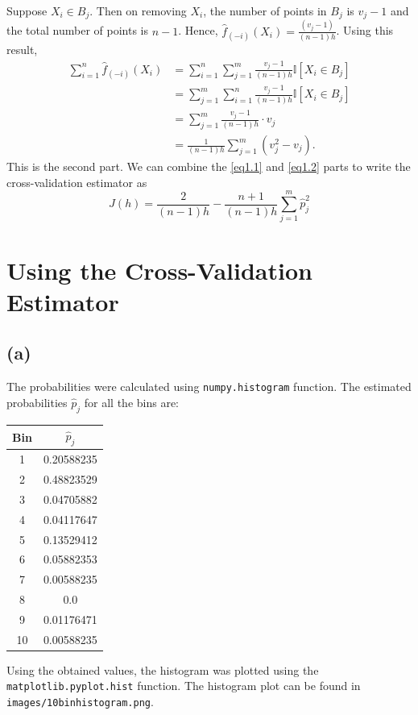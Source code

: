 Suppose $X_i\in B_j$. Then on removing $X_i$, the number of points in $B_j$ is
$v_j-1$ and the total number of points is $n-1$. Hence, $\hat{f}_{(-i)}(X_i) =
\frac{(v_j-1)}{(n-1)h}$. Using this result, 
\begin{equation}
  \begin{aligned}
    \sum_{i=1}^{n} \hat{f}_{(-i)}(X_i) &= \sum_{i=1}^{n}\sum_{j=1}^{m} \frac{v_j-
    1}{(n-1)h}\mathbb{I}[X_i\in B_j] \\
    &= \sum_{j=1}^{m}\sum_{i=1}^{n} \frac{v_j-1}{(n-1)h}\mathbb{I}[X_i\in B_j] \\
    &= \sum_{j=1}^{m} \frac{v_j-1}{(n-1)h}\cdot v_j \\
    &= \frac{1}{(n-1)h}\sum_{j=1}^{m} (v_j^2 - v_j).
  \end{aligned}
  \label{eq1.2}
\end{equation}
This is the second part. We can combine the \ref{eq1.1} and \ref{eq1.2} parts to
write the cross-validation estimator as 
\begin{equation*}
  \hat{J}(h) = \frac{2}{(n-1)h} - \frac{n+1}{(n-1)h}\sum_{j=1}^{m} \hat{p}_j^2
\end{equation*}

\section{ Using the Cross-Validation Estimator}

\subsection*{(a)}
The probabilities were calculated using \texttt{numpy.histogram} function. The
estimated probabilities $\hat{p}_j$ for all the bins are:
\begin{center}
  \begin{tabular}{ | c | c |}
    \hline
    \textbf{Bin} & \textbf{$\hat{p}_j$} \\
    \hline
    1 & 0.20588235 \\
    2 & 0.48823529 \\
    3 & 0.04705882 \\
    4 & 0.04117647 \\
    5 & 0.13529412 \\
    6 & 0.05882353 \\
    7 & 0.00588235 \\
    8 & 0.0 \\
    9 & 0.01176471 \\
    10 & 0.00588235 \\
    \hline
  \end{tabular}
\end{center}
Using the obtained values, the histogram was plotted using the
\texttt{matplotlib.pyplot.hist} function. The histogram plot can be found in
\texttt{images/10binhistogram.png}.

